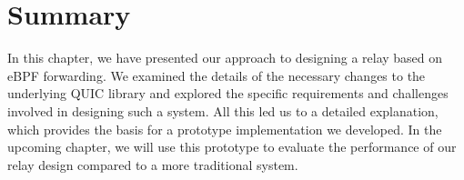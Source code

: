 \section{Summary}\label{sec:summary_ch3}

In this chapter, we have presented our approach to designing a relay based on eBPF forwarding.
We examined the details of the necessary changes to the underlying QUIC library 
and explored the specific requirements and challenges involved in designing such a system.
All this led us to a detailed explanation, which provides the basis for a 
prototype implementation we developed.
In the upcoming chapter, we will use this prototype to evaluate the 
performance of our relay design compared to a more traditional system.
